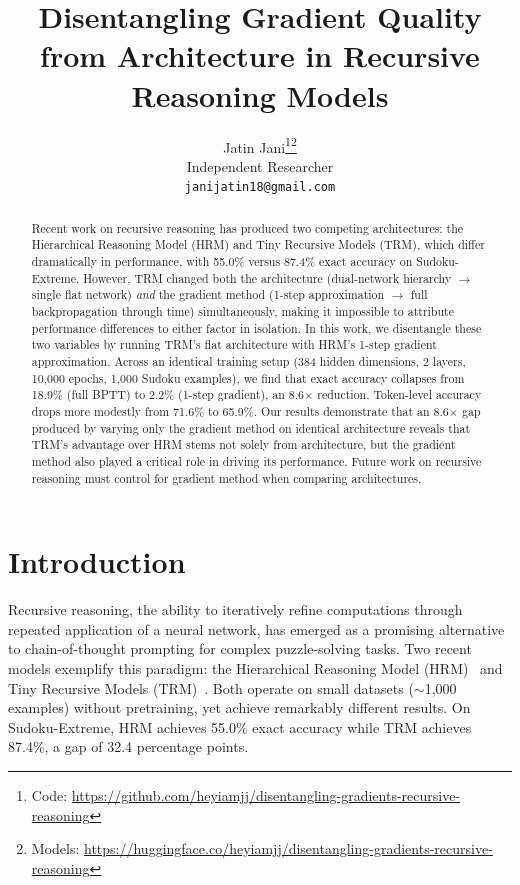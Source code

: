 \documentclass{article}
\title{Disentangling Gradient Quality from Architecture in Recursive Reasoning Models}
\author{
  Jatin Jani\thanks{Code: \url{https://github.com/heyiamjj/disentangling-gradients-recursive-reasoning}}\thanks{Models: \url{https://huggingface.co/heyiamjj/disentangling-gradients-recursive-reasoning}} \\
  Independent Researcher \\
  \texttt{janijatin18@gmail.com}
}
\begin{document}
\maketitle

\begin{abstract}
Recent work on recursive reasoning has produced two competing architectures: the Hierarchical Reasoning Model (HRM) and Tiny Recursive Models (TRM), which differ dramatically in performance, with 55.0\% versus 87.4\% exact accuracy on Sudoku-Extreme. However, TRM changed both the architecture (dual-network hierarchy $\rightarrow$ single flat network) \emph{and} the gradient method (1-step approximation $\rightarrow$ full backpropagation through time) simultaneously, making it impossible to attribute performance differences to either factor in isolation. In this work, we disentangle these two variables by running TRM's flat architecture with HRM's 1-step gradient approximation. Across an identical training setup (384 hidden dimensions, 2 layers, 10,000 epochs, 1,000 Sudoku examples), we find that exact accuracy collapses from 18.9\% (full BPTT) to 2.2\% (1-step gradient), an 8.6$\times$ reduction. Token-level accuracy drops more modestly from 71.6\% to 65.9\%. Our results demonstrate that an 8.6$\times$ gap produced by varying only the gradient method on identical architecture reveals that TRM's advantage over HRM stems not solely from architecture, but the gradient method also played a critical role in driving its performance. Future work on recursive reasoning must control for gradient method when comparing architectures.
\end{abstract}


\section{Introduction}

Recursive reasoning, the ability to iteratively refine computations through repeated application of a neural network, has emerged as a promising alternative to chain-of-thought prompting for complex puzzle-solving tasks. Two recent models exemplify this paradigm: the Hierarchical Reasoning Model (HRM)~\cite{wang2025hrm} and Tiny Recursive Models (TRM)~\cite{jolicoeur2025trm}. Both operate on small datasets ($\sim$1,000 examples) without pretraining, yet achieve remarkably different results. On Sudoku-Extreme, HRM achieves 55.0\% exact accuracy while TRM achieves 87.4\%, a gap of 32.4 percentage points.
\end{document}
